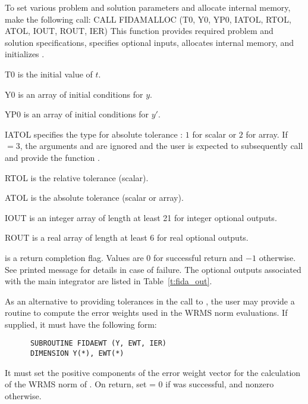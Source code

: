 \begin{Steps}
  To set various problem and solution parameters and allocate
  internal memory, make the following call:
  {
     CALL FIDAMALLOC (T0, Y0, YP0, IATOL, RTOL, ATOL, IOUT, ROUT, IER)
  }
  {
    This function provides required problem and solution specifications, 
    specifies optional inputs,
    allocates internal memory, and initializes {\ida}.
  }
  {
    \begin{args}[IATOL]
    \item[T0] is the initial value of $t$.
    \item[Y0] is an array of initial conditions for $y$.
    \item[YP0] is an array of initial conditions for $y'$.
    \item[IATOL] specifies the type for absolute tolerance :
      $1$ for scalar or $2$ for array. If $=3$, the arguments
       and  are ignored and the user is expected to
      subsequently call  and provide the function .
    \item[RTOL] is the relative tolerance (scalar).
    \item[ATOL] is the absolute tolerance (scalar or array).
    \item[IOUT] is an integer array of length at least 21 for integer optional
                outputs.
    \item[ROUT] is a real array of length at least 6 for real optional outputs.
    \end{args}
  }
  {
     is a return completion flag.  Values are $0$ for successful return
    and $-1$ otherwise. See printed message for details in case of failure.
  }
  {
    The optional outputs associated with the main {\ida} integrator
    are listed in Table~\ref{t:fida_out}.
  }

  As an alternative to providing tolerances in the call to , the
  user may provide a routine to compute the error weights used in the WRMS norm
  evaluations. If supplied, it must have the following form:
\begin{verbatim}
      SUBROUTINE FIDAEWT (Y, EWT, IER)
      DIMENSION Y(*), EWT(*)
\end{verbatim}
  It must set the positive components of the error weight vector  for
  the calculation of the WRMS norm of . On return, set
   = 0 if  was successful, and nonzero otherwise.


\end{Steps}
